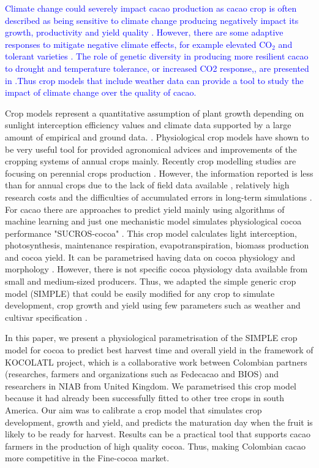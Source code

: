 \documentclass[gene,journal,article,submit,moreauthors,pdftex]{Definitions/mdpi}
\begin{document}
\textcolor{blue}{Climate change could severely impact cacao production as cacao crop is often described as being sensitive to climate change  producing negatively impact its growth, productivity and yield quality  \citep{zuidema2005, Ceccarelli2021}. However, there are some   	 adaptive responses to mitigate negative climate  effects, for example elevated CO$_{2}$ and tolerant varieties \citep{lahive2019, Ceccarelli2021}.  The role of genetic diversity in producing more resilient cacao  to drought and temperature tolerance, or increased CO2 response,, are presented in \citep{Medina2017} .Thus crop models that include weather data can provide a tool to study the impact of climate change over the quality of cacao. }

Crop models represent a quantitative assumption of plant growth depending on sunlight interception efficiency values and climate data supported by a large amount of empirical and ground data. \citep{Reynolds2018}. Physiological crop models have shown to be very useful tool for provided agronomical advices and improvements of the cropping systems of annual crops mainly. Recently crop modelling studies are focusing on  perennial crops  production \citep{zuidema2005, Zao2019simple, Bai2020, Romero2021}. However, the information reported  is less than for annual crops due to the lack of field data available , relatively high research costs and the difficulties of accumulated errors in long-term simulations \citep{zuidema2005}. For cacao there are  approaches  to predict yield mainly  using algorithms of machine learning \citep{lamos2020} and just one mechanistic model simulates physiological cocoa performance  "SUCROS-cocoa" \citep{zuidema2005}. This crop model calculates light interception, photosynthesis, maintenance respiration,
evapotranspiration, biomass production and cocoa yield. It can be parametrised having data on cocoa physiology and morphology \citep{zuidema2005}. However,  there is not specific cocoa physiology data available from small and medium-sized producers. Thus, we adapted the simple generic crop model (SIMPLE) that could be easily modified for any crop to simulate development, crop growth and yield using few parameters such as weather and cultivar specification \citep{Zao2019simple}.

In this paper, we present a physiological parametrisation of the SIMPLE crop model \citep{Zao2019simple} for cocoa to predict best harvest time and overall yield in the framework of KOCOLATL project, which is a collaborative work between Colombian partners (researches, farmers and organizations such as Fedecacao and BIOS) and researchers in NIAB from United Kingdom. We parametrised this crop model  because it had already been successfully fitted to other tree crops in south America.  Our aim was to calibrate a crop model that simulates crop development, growth and yield, and predicts the maturation day when the fruit is likely to be ready for harvest. Results can be a practical tool that supports cacao farmers in the production of high quality cocoa. Thus, making Colombian cacao more competitive in the Fine-cocoa market.
\end{document}
